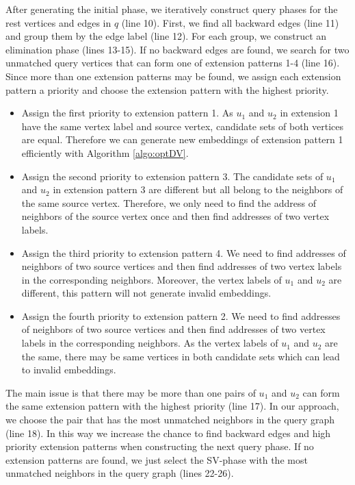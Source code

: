 After generating the initial phase, we iteratively construct query phases for the rest vertices and edges in $q$ (line 10). First, we find all backward edges (line 11) and group them by the edge label (line 12). For each group, we construct an elimination phase (lines 13-15). If no backward edges are found, we search for two unmatched query vertices that can form one of extension patterns 1-4 (line 16). Since more than one extension patterns may be found, we assign each extension pattern a priority and choose the extension pattern with the highest priority.
\begin{itemize}
  \item Assign the first priority to extension pattern 1. As $u_1$ and $u_2$ in extension 1 have the same vertex label and source vertex, candidate sets of both vertices are equal. Therefore we can generate new embeddings of extension pattern 1 efficiently with Algorithm \ref{algo:optDV}.
  \item Assign the second priority to extension pattern 3. The candidate sets of $u_1$ and $u_2$ in extension pattern 3 are different but all belong to the neighbors of the same source vertex. Therefore, we only need to find the address of neighbors of the source vertex once and then find addresses of two vertex labels.
  \item Assign the third priority to extension pattern 4. We need to find addresses of neighbors of two source vertices and then find addresses of two vertex labels in the corresponding neighbors. Moreover, the vertex labels of $u_1$ and $u_2$ are different, this pattern will not generate invalid embeddings.
  \item Assign the fourth priority to extension pattern 2. We need to find addresses of neighbors of two source vertices and then find addresses of two vertex labels in the corresponding neighbors. As the vertex labels of $u_1$ and $u_2$ are the same, there may be same vertices in both candidate sets which can lead to invalid embeddings.
\end{itemize}

 The main issue is that there may be more than one pairs of $u_1$ and $u_2$ can form the same extension pattern with the highest priority (line 17). In our approach, we choose the pair that has the most unmatched neighbors in the query graph (line 18). In this way we increase the chance to find backward edges and high priority extension patterns when constructing the next query phase.
 If no extension patterns are found, we just select the SV-phase with the most unmatched neighbors in the query graph (lines 22-26).

